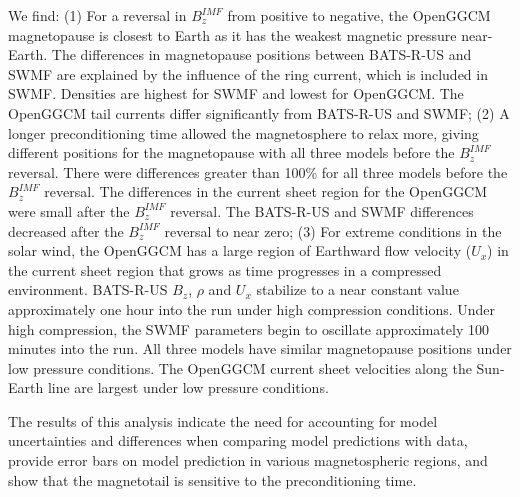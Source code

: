 \documentclass[11 pt]{report}
\begin{document}
\abstractmultiplepage We find: (1) For a reversal in $B_z^{IMF}$ from positive
to negative, the OpenGGCM magnetopause is closest to Earth as it has the weakest
magnetic pressure near-Earth. The differences in magnetopause positions between
BATS-R-US and SWMF are explained by the influence of the ring current, which is
included in SWMF. Densities are highest for SWMF and lowest for OpenGGCM. The
OpenGGCM tail currents differ significantly from BATS-R-US and SWMF; (2) A
longer preconditioning time allowed the magnetosphere to relax more, giving
different positions for the magnetopause with all three models before the
$B_z^{IMF}$ reversal. There were differences greater than 100\% for all three
models before the $B_z^{IMF}$ reversal. The differences in the current sheet
region for the OpenGGCM were small after the $B_z^{IMF}$ reversal. The BATS-R-US
and SWMF differences decreased after the $B_z^{IMF}$ reversal to near zero; (3)
For extreme conditions in the solar wind, the OpenGGCM has a large region of
Earthward flow velocity ($U_x$) in the current sheet region that grows as time
progresses in a compressed environment. BATS-R-US $B_z$, $\rho$ and $U_x$ stabilize to a near constant value approximately one hour into the run under high compression conditions. Under
high compression, the SWMF parameters begin to oscillate approximately 100 minutes into
the run. All three models have similar magnetopause positions under low pressure
conditions. The OpenGGCM current sheet velocities along the Sun-Earth line are
largest under low pressure conditions.

The results of this analysis indicate the need for accounting for model
uncertainties and differences when comparing model predictions with data, provide error bars on
model prediction in various magnetospheric regions, and show that the
magnetotail is sensitive to the preconditioning time.



\startofchapters





\end{document}
